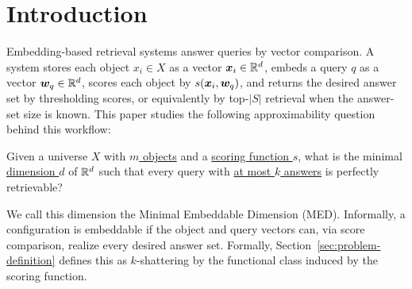 \documentclass{article}
\begin{document}
\printAffiliationsAndNotice{}  %

\begin{abstract}
This paper studies the Minimal Embeddable Dimension (MED): the least dimension in which there exists a configuration of $m$ object vectors so that every subset of size at most $k$ is exactly retrieved by score comparison. Our result shows MED is $\Theta(k)$, independent of $m$, for inner product, Euclidean distance, and cosine similarity. We then consider Robust MED (RMED), where all vectors are unit normed and an $\epsilon$ gap of scores is required. We derive the $m$-dependent feasibility ceiling $\epsilon_\star(m,k)=m/\sqrt{k(m-1)(m-k)}$, which approaches $1/\sqrt{k}$ when $m\gg k$, and a Gaussian centroid construction gives a robust witness upper bound in the feasible margin regime. Numerical simulation on synthetic top-$2$ retrieval with cyclic polytope and centroid query optimization confirmed our theoretical claims. Experiments on LIMIT and LIMIT-small datasets also show that simple embedding-based retrieval baselines can overfit and outperform the reported single-vector LLM embedding baseline. Both theoretical and empirical findings rule out the lack of exact geometric capacity as the obstruction.
\end{abstract}

\section{Introduction}

Embedding-based retrieval systems answer queries by vector comparison. A system stores each object $x_i\in X$ as a vector $\bm{x}_i\in \mathbb{R}^d$, embeds a query $q$ as a vector $\bm{w}_q\in \mathbb{R}^d$, scores each object by $s(\bm{x}_i,\bm{w}_q)$, and returns the desired answer set by thresholding scores, or equivalently by top-$|S|$ retrieval when the answer-set size is known. This paper studies the following approximability question behind this workflow:
\begin{tcolorbox}[colback=gray!6, colframe=black!60, sharp corners, boxrule=0.5pt]
Given a universe $X$ with \underline{$m$ objects} and a \underline{scoring function $s$}, what is the minimal \underline{dimension $d$} of $\mathbb{R}^d$ such that every query with \underline{at most $k$ answers} is perfectly retrievable?
\end{tcolorbox}
We call this dimension the Minimal Embeddable Dimension (MED). Informally, a configuration is embeddable if the object and query vectors can, via score comparison, realize every desired answer set. Formally, Section~\ref{sec:problem-definition} defines this as $k$-shattering by the functional class induced by the scoring function.
\end{document}
